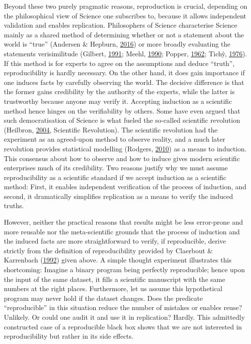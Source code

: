 \documentclass[12pt,a4paper,]{article}
\begin{document}
Beyond these two purely pragmatic reasons, reproduction is crucial, depending on the philosophical view of Science one subscribes to, because it allows independent validation and enables replication.
Philosophers of Science characterise Science mainly as a shared method of determining whether or not a statement about the world is ``true'' (Andersen \& Hepburn, \protect\hyperlink{ref-andersonScientificMethod2016}{2016}) or more broadly evaluating the statements verisimilitude (Gilbert, \protect\hyperlink{ref-gilbertModelBuildingDefinition1991}{1991}; Meehl, \protect\hyperlink{ref-meehlAppraisingAmendingTheories1990}{1990}; Popper, \protect\hyperlink{ref-popperCommentsTruthGrowth1962}{1962}; Tichỳ, \protect\hyperlink{ref-tichyVerisimilitudeRedefined1976}{1976}).
If this method is for experts to agree on the assumptions and deduce ``truth'', reproducibility is hardly necessary.
On the other hand, it does gain importance if one induces facts by carefully observing the world.
The decisive difference is that the former gains credibility by the authority of the experts, while the latter is trustworthy because anyone may verify it.
Accepting induction as a scientific method hence hinges on the verifiability by others.
Some have even argued that such democratisation of Science is what fueled the so-called scientific revolution (Heilbron, \protect\hyperlink{ref-heilbronOxfordCompanionHistory2004}{2004}, Scientific Revolution).
The scientific revolution had the experiment as an agreed-upon method to observe reality, and a much later revolution provides statistical modelling (Rodgers, \protect\hyperlink{ref-rodgersEpistemologyMathematicalStatistical2010}{2010}) as a means to induction.
This consensus about how to observe and how to induce gives modern scientific enterprises much of its credibility.
Two reasons justify why we must assume reproducibility as a scientific standard if we accept induction as a scientific method:
First, it enables independent verification of the process of induction, and second, it dramatically simplifies replication as a means to verify the induced truths.

However, neither the practical reasons that results might be less error-prone and more reusable nor the meta-scientific grounds that the process of induction and the induced facts are more straightforward to verify, if reproducible, derive strictly from the definition of reproducibility provided by Claerbout \& Karrenbach (\protect\hyperlink{ref-claerboutElectronicDocumentsGive1992}{1992}) given above.
A simple thought experiment illustrates this shortcoming:
Imagine a binary program being perfectly reproducible; hence upon the input of the same dataset, it fills a scientific manuscript with the same numbers at the right places.
Furthermore, let us assume this hypothetical program may never hold if the dataset changes.
Does the predicate ``reproducible'' in this situation reduce the number of mistakes or enables reuse? Unlikely.
Or could one audit it and use it in replication? Hardly.
This admittedly constructed case of a reproducible black box shows that we are not interested in reproducibility but rather in its side effects.
\end{document}
